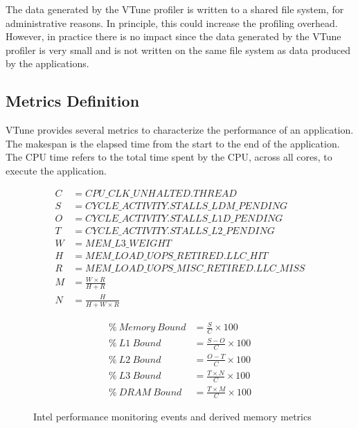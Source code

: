 \documentclass[conference]{IEEEtran}
\begin{document}
The data generated by the VTune profiler is written to a shared file system, for administrative reasons. In principle, this could increase the profiling overhead. However, in practice there is no impact since the data generated by the VTune profiler is very small and is not written on the same file system as data produced by the applications.
			
\subsection{Metrics Definition}
VTune provides several metrics to characterize the performance of an application.  The makespan is the elapsed time from the start to the end of the application. The CPU time refers to the total time spent by the CPU, across all cores, to execute the application. 
\begin{figure}[h!]
	\noindent
	\begin{minipage}
		{0.5\textwidth}
		\begin{align*}
			C & = CPU\_CLK\_UNHALTED.THREAD                \\
			S & = CYCLE\_ACTIVITY.STALLS\_LDM\_PENDING     \\
			O & = CYCLE\_ACTIVITY.STALLS\_L1D\_PENDING     \\
			T & = CYCLE\_ACTIVITY.STALLS\_L2\_PENDING      \\
			W & = MEM\_L3\_WEIGHT                          \\
			H & = MEM\_LOAD\_UOPS\_RETIRED.LLC\_HIT        \\
			R & = MEM\_LOAD\_UOPS\_MISC\_RETIRED.LLC\_MISS \\
			M & = \frac{W \times R}{H + R}                 \\
			N & = \frac{H}{H + W \times R}                 
		\end{align*}
	\end{minipage}
	\begin{minipage}
		{0.5\textwidth}
		\begin{align}
			\%~Memory~Bound & = \frac{S}{C} \times 100          \\
			\%~L1~Bound     & = \frac{S - O}{C} \times 100      \\
			\%~L2~Bound     & = \frac{O - T}{C} \times 100      \\
			\%~L3~Bound     & = \frac{T \times N}{C} \times 100 \\
			\%~DRAM~Bound   & = \frac{T \times M}{C} \times 100 
		\end{align}
	\end{minipage}
	\caption{Intel performance monitoring events and derived memory metrics}
	\label{fig:memory-metrics}
\end{figure}	
\end{document}
